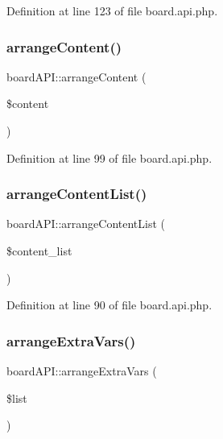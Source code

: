 Definition at line 123 of file board.\+api.\+php.

\hypertarget{classboardAPI_a8c3e9522bfba03480917fd7485de99c9}{}\label{classboardAPI_a8c3e9522bfba03480917fd7485de99c9} 
\subsubsection{\texorpdfstring{arrange\+Content()}{arrangeContent()}}
{\footnotesize\ttfamily board\+A\+P\+I\+::arrange\+Content (\begin{DoxyParamCaption}\item[{}]{\$content }\end{DoxyParamCaption})}



Definition at line 99 of file board.\+api.\+php.

\hypertarget{classboardAPI_ade487a5bde6abbc987dbe44f8adf8c22}{}\label{classboardAPI_ade487a5bde6abbc987dbe44f8adf8c22} 
\subsubsection{\texorpdfstring{arrange\+Content\+List()}{arrangeContentList()}}
{\footnotesize\ttfamily board\+A\+P\+I\+::arrange\+Content\+List (\begin{DoxyParamCaption}\item[{}]{\$content\+\_\+list }\end{DoxyParamCaption})}



Definition at line 90 of file board.\+api.\+php.

\hypertarget{classboardAPI_a80b7a5fb897ce7a42ff20c05f36b6522}{}\label{classboardAPI_a80b7a5fb897ce7a42ff20c05f36b6522} 
\subsubsection{\texorpdfstring{arrange\+Extra\+Vars()}{arrangeExtraVars()}}
{\footnotesize\ttfamily board\+A\+P\+I\+::arrange\+Extra\+Vars (\begin{DoxyParamCaption}\item[{}]{\$list }\end{DoxyParamCaption})}




